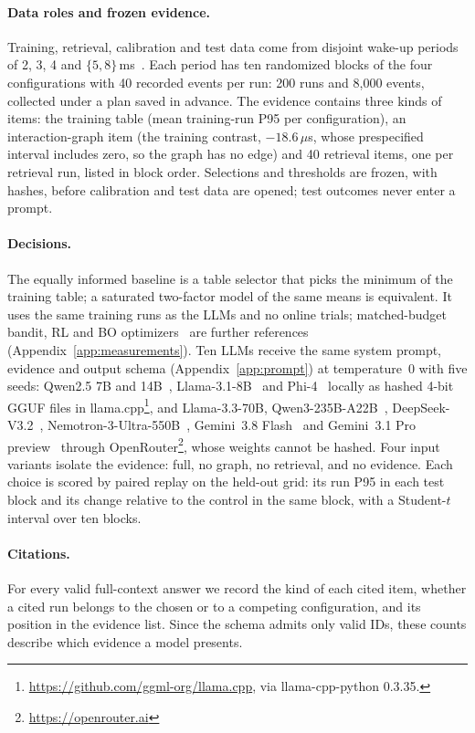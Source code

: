 \paragraph{Data roles and frozen evidence.}
Training, retrieval, calibration and test data come from disjoint wake-up periods of 2, 3, 4 and $\{5,8\}$\,ms~\cite{Sogaard2021RandomSplits}. Each period has ten randomized blocks of the four configurations with 40 recorded events per run: 200 runs and 8,000 events, collected under a plan saved in advance. The evidence contains three kinds of items: the training table (mean training-run P95 per configuration), an interaction-graph item (the training contrast, $-18.6\,\mu$s, whose prespecified interval includes zero, so the graph has no edge) and 40 retrieval items, one per retrieval run, listed in block order. Selections and thresholds are frozen, with hashes, before calibration and test data are opened; test outcomes never enter a prompt.

\paragraph{Decisions.}
The equally informed baseline is a table selector that picks the minimum of the training table; a saturated two-factor model of the same means is equivalent. It uses the same training runs as the LLMs and no online trials; matched-budget bandit, RL and BO optimizers~\cite{Auer2002UCB,Snoek2012BO} are further references (Appendix~\ref{app:measurements}). Ten LLMs receive the same system prompt, evidence and output schema (Appendix~\ref{app:prompt}) at temperature~0 with five seeds: Qwen2.5 7B and 14B~\cite{Qwen2024Qwen25}, Llama-3.1-8B~\cite{Grattafiori2024Llama3} and Phi-4~\cite{Abdin2024Phi4} locally as hashed 4-bit GGUF files in llama.cpp\footnote{\url{https://github.com/ggml-org/llama.cpp}, via llama-cpp-python 0.3.35.}, and Llama-3.3-70B, Qwen3-235B-A22B~\cite{Yang2025Qwen3}, DeepSeek-V3.2~\cite{DeepSeek2025V32}, Nemotron-3-Ultra-550B~\cite{NVIDIA2026Nemotron3Ultra}, Gemini~3.8 Flash~\cite{Google2026Gemini38Flash} and Gemini~3.1 Pro preview~\cite{Google2026Gemini31Pro} through OpenRouter\footnote{\url{https://openrouter.ai}}, whose weights cannot be hashed. Four input variants isolate the evidence: full, no graph, no retrieval, and no evidence. Each choice is scored by paired replay on the held-out grid: its run P95 in each test block and its change relative to the control in the same block, with a Student-$t$ interval over ten blocks.

\paragraph{Citations.}
For every valid full-context answer we record the kind of each cited item, whether a cited run belongs to the chosen or to a competing configuration, and its position in the evidence list. Since the schema admits only valid IDs, these counts describe which evidence a model presents.

